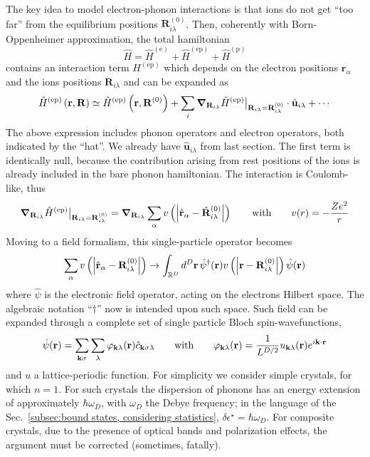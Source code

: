 The key idea to model electron-phonon interactions is that ions do not get ``too far'' from the equilibrium positions $\mathbf{R}_{i\lambda}^{(0)}$. Then, coherently with Born-Oppenheimer approximation, the total hamiltonian
\[
	\hat H = \hat H^{(\mathrm{e})} + \hat H^{(\mathrm{ep})} + \hat H^{(\mathrm{p})}
\]
contains an interaction term $H^{(\mathrm{ep})}$ which depends on the electron positions $\mathbf{r}_\alpha$ and the ions positions $\mathbf{R}_{i\lambda}$ and can be expanded as
\[
	\hat H^{(\mathrm{ep})} \left({\mathbf{r},\mathbf{R}}\right) \simeq \hat H^{(\mathrm{ep})} \left({\mathbf{r},\mathbf{R}^{(0)}}\right) + \sum_i \grad_{\mathbf{R}_{i\lambda}} \hat{H}^{(\mathrm{ep})} \big|_{\mathbf{R}_{i\lambda} = \mathbf{R}_{i\lambda}^{(0)}} \cdot \hat{\mathbf{u}}_{i\lambda} + \cdots
\]
The above expression includes phonon operators and electron operators, both indicated by the ``hat''. We already have $\hat{\mathbf{u}}_{i\lambda}$ from last section. The first term is identically null, because the contribution arising from rest positions of the ions is already included in the bare phonon hamiltonian. The interaction is Coulomb-like, thus
\[
	\grad_{\mathbf{R}_{i\lambda}} \hat{H}^{(\mathrm{ep})}\big|_{\mathbf{R}_{i\lambda} = \mathbf{R}_{i\lambda}^{(0)}} = \grad_{\mathbf{R}_{i\lambda}} \sum_\alpha v \lrR{\abs{\hat{\mathbf{r}}_\alpha - \hat{\mathbf{R}}_{i\lambda}^{(0)}}}
	\quad\qq{with}\quad
	v(r) = -\frac{Ze^2}{r}	
\]
Moving to a field formalism, this single-particle operator becomes
\[
	\sum_\alpha v \left({\abs{\hat{\mathbf{r}}_\alpha - \mathbf{R}_{i\lambda}^{(0)}}}\right) \to \int_{\mathbb{R}^D} d^D \mathbf{r} \, \hat{\psi}^\dagger (\mathbf{r}) v \left({\abs{\mathbf{r} - \mathbf{R}_{i\lambda}^{(0)}}}\right) \hat{\psi} (\mathbf{r})
\]
where $\hat{\psi}$ is the electronic field operator, acting on the electrons Hilbert space. The algebraic notation ``$\dagger$'' now is intended upon such space. Such field can be expanded through a complete set of single particle Bloch spin-wavefunctions,
\[
	\hat\psi(\mathbf{r}) = \sum_{\mathbf{k}\sigma} \sum_\lambda \varphi_{\mathbf{k}\lambda}(\mathbf{r}) \hat c_{\mathbf{k}\sigma\lambda}
	\quad\qq{with}\quad
	\varphi_{\mathbf{k}\lambda}(\mathbf{r}) = \frac{1}{L^{D/2}} u_{\mathbf{k}\lambda} (\mathbf{r}) e^{i \mathbf{k} \cdot \mathbf{r}}
\]
and $u$ a lattice-periodic function.
For simplicity we consider simple crystals, for which $n=1$. For such crystals the dispersion of phonons has an energy extension of approximately $\hbar\omega_D$, with $\omega_D$ the Debye frequency; in the language of the Sec.~\ref{subsec:bound states, considering statistics}, $\delta\epsilon^\star = \hbar\omega_D$. For composite crystals, due to the presence of optical bands and polarization effects, the argument must be corrected (sometimes, fatally).

